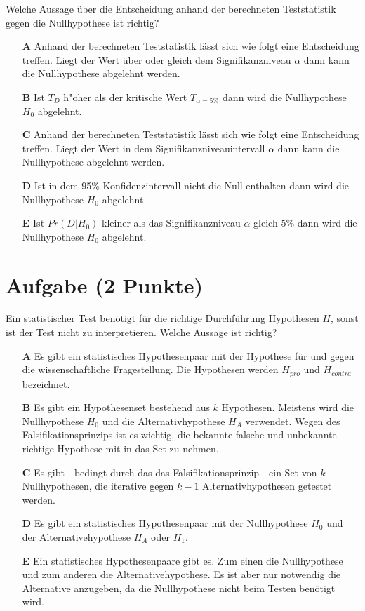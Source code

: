 \documentclass[a4paper, 9pt]{scrartcl}\usepackage[]{graphicx}\usepackage[]{xcolor}
\begin{document}
Welche Aussage über die Entscheidung anhand der berechneten Teststatistik gegen die
Nullhypothese ist richtig?



\begin{enumerate}
\item [\textbf{A} \msquare] Anhand der berechneten Teststatistik lässt sich wie folgt eine Entscheidung treffen. Liegt der Wert über oder gleich dem Signifikanzniveau $\alpha$ dann kann die Nullhypothese abgelehnt werden.
\item [\textbf{B} \msquare] Ist $T_{D}$ h{"o}her als der kritische Wert $T_{\alpha = 5\%}$ dann wird die Nullhypothese $H_0$ abgelehnt.
\item [\textbf{C} \msquare] Anhand der berechneten Teststatistik lässt sich wie folgt eine Entscheidung treffen. Liegt der Wert in dem Signifikanzniveauintervall $\alpha$ dann kann die Nullhypothese abgelehnt werden.
\item [\textbf{D} \msquare] Ist in dem 95\%-Konfidenzintervall nicht die Null enthalten dann wird die Nullhypothese $H_0$ abgelehnt.
\item [\textbf{E} \msquare] Ist $Pr(D|H_0)$ kleiner als das Signifikanzniveau $\alpha$ gleich $5\%$ dann wird die Nullhypothese $H_0$ abgelehnt.
\end{enumerate}

\section{Aufgabe \hfill (2 Punkte)}



Ein statistischer Test benötigt für die richtige Durchführung Hypothesen $H$, sonst ist der Test nicht zu interpretieren. Welche Aussage ist richtig?



\begin{enumerate}
\item [\textbf{A} \msquare] Es gibt ein statistisches Hypothesenpaar mit der Hypothese für und gegen die wissenschaftliche Fragestellung. Die Hypothesen werden $H_{pro}$ und $H_{contra}$ bezeichnet.
\item [\textbf{B} \msquare] Es gibt ein Hypothesenset bestehend aus $k$ Hypothesen. Meistens wird die Nullhypothese $H_0$ und die Alternativhypothese $H_A$ verwendet. Wegen des Falsifikationsprinzips ist es wichtig, die bekannte falsche und unbekannte richtige Hypothese mit in das Set zu nehmen.
\item [\textbf{C} \msquare] Es gibt - bedingt durch das das Falsifikationsprinzip - ein Set von $k$ Nullhypothesen, die iterative gegen $k-1$ Alternativhypothesen getestet werden.
\item [\textbf{D} \msquare] Es gibt ein statistisches Hypothesenpaar mit der Nullhypothese $H_0$ und der Alternativehypothese $H_A$ oder $H_1$.
\item [\textbf{E} \msquare] Ein statistisches Hypothesenpaare gibt es. Zum einen die Nullhypothese und zum anderen die Alternativehypothese. Es ist aber nur notwendig die Alternative anzugeben, da die Nullhypothese nicht beim Testen benötigt wird.
\end{enumerate}
\end{document}
